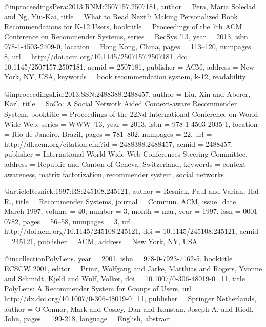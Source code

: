 @inproceedings{Pera:2013:RNM:2507157.2507181,
	author = {Pera, Maria Soledad and Ng, Yiu-Kai},
	title = {What to Read Next?: Making Personalized Book Recommendations for K-12 Users},
	booktitle = {Proceedings of the 7th ACM Conference on Recommender Systems},
	series = {RecSys '13},
	year = {2013},
	isbn = {978-1-4503-2409-0},
	location = {Hong Kong, China},
	pages = {113--120},
	numpages = {8},
	url = {http://doi.acm.org/10.1145/2507157.2507181},
	doi = {10.1145/2507157.2507181},
	acmid = {2507181},
	publisher = {ACM},
	address = {New York, NY, USA},
	keywords = {book recommendation system, k-12, readability}
}


@inproceedings{Liu:2013:SSN:2488388.2488457,
	author = {Liu, Xin and Aberer, Karl},
	title = {SoCo: A Social Network Aided Context-aware Recommender System},
	booktitle = {Proceedings of the 22Nd International Conference on World Wide Web},
	series = {WWW '13},
	year = {2013},
	isbn = {978-1-4503-2035-1},
	location = {Rio de Janeiro, Brazil},
	pages = {781--802},
	numpages = {22},
	url = {http://dl.acm.org/citation.cfm?id = 2488388.2488457},
	acmid = {2488457},
	publisher = {International World Wide Web Conferences Steering Committee},
	address = {Republic and Canton of Geneva, Switzerland},
	keywords = {context-awareness, matrix factorization, recommender system, social networks}
}

%
@article{Resnick:1997:RS:245108.245121,
	author = {Resnick, Paul and Varian, Hal R.},
	title = {Recommender Systems},
	journal = {Commun. ACM},
	issue_date = {March 1997},
	volume = {40},
	number = {3},
	month = mar,
	year = {1997},
	issn = {0001-0782},
	pages = {56--58},
	numpages = {3},
	url = {http://doi.acm.org/10.1145/245108.245121},
	doi = {10.1145/245108.245121},
	acmid = {245121},
	publisher = {ACM},
	address = {New York, NY, USA}
}

@incollection{PolyLens,
	year = {2001},
	isbn = {978-0-7923-7162-5},
	booktitle = {ECSCW 2001},
	editor = {Prinz, Wolfgang and Jarke, Matthias and Rogers, Yvonne and Schmidt, Kjeld and Wulf, Volker},
	doi = {10.1007/0-306-48019-0_11},
	title = {PolyLens: A Recommender System for Groups of Users},
	url = {http://dx.doi.org/10.1007/0-306-48019-0_11},
	publisher = {Springer Netherlands},
	author = {O’Connor, Mark and Cosley, Dan and Konstan, Joseph A. and Riedl, John},
	pages = {199-218},
	language = {English},
  abstract = {}
}

